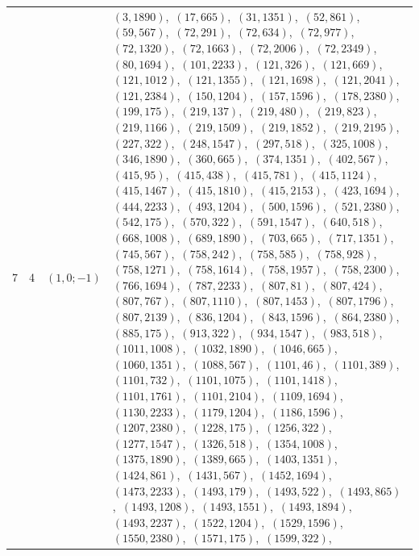 \documentclass[11pt]{article}
\begin{document}
\begin{longtable}{@{}rrl>{\raggedright\arraybackslash}p{}@{}}
7 & 4 & $(1,0;-1)$ & $(3,1890)$,\allowbreak\ $(17,665)$,\allowbreak\ $(31,1351)$,\allowbreak\ $(52,861)$,\allowbreak\ $(59,567)$,\allowbreak\ $(72,291)$,\allowbreak\ $(72,634)$,\allowbreak\ $(72,977)$,\allowbreak\ $(72,1320)$,\allowbreak\ $(72,1663)$,\allowbreak\ $(72,2006)$,\allowbreak\ $(72,2349)$,\allowbreak\ $(80,1694)$,\allowbreak\ $(101,2233)$,\allowbreak\ $(121,326)$,\allowbreak\ $(121,669)$,\allowbreak\ $(121,1012)$,\allowbreak\ $(121,1355)$,\allowbreak\ $(121,1698)$,\allowbreak\ $(121,2041)$,\allowbreak\ $(121,2384)$,\allowbreak\ $(150,1204)$,\allowbreak\ $(157,1596)$,\allowbreak\ $(178,2380)$,\allowbreak\ $(199,175)$,\allowbreak\ $(219,137)$,\allowbreak\ $(219,480)$,\allowbreak\ $(219,823)$,\allowbreak\ $(219,1166)$,\allowbreak\ $(219,1509)$,\allowbreak\ $(219,1852)$,\allowbreak\ $(219,2195)$,\allowbreak\ $(227,322)$,\allowbreak\ $(248,1547)$,\allowbreak\ $(297,518)$,\allowbreak\ $(325,1008)$,\allowbreak\ $(346,1890)$,\allowbreak\ $(360,665)$,\allowbreak\ $(374,1351)$,\allowbreak\ $(402,567)$,\allowbreak\ $(415,95)$,\allowbreak\ $(415,438)$,\allowbreak\ $(415,781)$,\allowbreak\ $(415,1124)$,\allowbreak\ $(415,1467)$,\allowbreak\ $(415,1810)$,\allowbreak\ $(415,2153)$,\allowbreak\ $(423,1694)$,\allowbreak\ $(444,2233)$,\allowbreak\ $(493,1204)$,\allowbreak\ $(500,1596)$,\allowbreak\ $(521,2380)$,\allowbreak\ $(542,175)$,\allowbreak\ $(570,322)$,\allowbreak\ $(591,1547)$,\allowbreak\ $(640,518)$,\allowbreak\ $(668,1008)$,\allowbreak\ $(689,1890)$,\allowbreak\ $(703,665)$,\allowbreak\ $(717,1351)$,\allowbreak\ $(745,567)$,\allowbreak\ $(758,242)$,\allowbreak\ $(758,585)$,\allowbreak\ $(758,928)$,\allowbreak\ $(758,1271)$,\allowbreak\ $(758,1614)$,\allowbreak\ $(758,1957)$,\allowbreak\ $(758,2300)$,\allowbreak\ $(766,1694)$,\allowbreak\ $(787,2233)$,\allowbreak\ $(807,81)$,\allowbreak\ $(807,424)$,\allowbreak\ $(807,767)$,\allowbreak\ $(807,1110)$,\allowbreak\ $(807,1453)$,\allowbreak\ $(807,1796)$,\allowbreak\ $(807,2139)$,\allowbreak\ $(836,1204)$,\allowbreak\ $(843,1596)$,\allowbreak\ $(864,2380)$,\allowbreak\ $(885,175)$,\allowbreak\ $(913,322)$,\allowbreak\ $(934,1547)$,\allowbreak\ $(983,518)$,\allowbreak\ $(1011,1008)$,\allowbreak\ $(1032,1890)$,\allowbreak\ $(1046,665)$,\allowbreak\ $(1060,1351)$,\allowbreak\ $(1088,567)$,\allowbreak\ $(1101,46)$,\allowbreak\ $(1101,389)$,\allowbreak\ $(1101,732)$,\allowbreak\ $(1101,1075)$,\allowbreak\ $(1101,1418)$,\allowbreak\ $(1101,1761)$,\allowbreak\ $(1101,2104)$,\allowbreak\ $(1109,1694)$,\allowbreak\ $(1130,2233)$,\allowbreak\ $(1179,1204)$,\allowbreak\ $(1186,1596)$,\allowbreak\ $(1207,2380)$,\allowbreak\ $(1228,175)$,\allowbreak\ $(1256,322)$,\allowbreak\ $(1277,1547)$,\allowbreak\ $(1326,518)$,\allowbreak\ $(1354,1008)$,\allowbreak\ $(1375,1890)$,\allowbreak\ $(1389,665)$,\allowbreak\ $(1403,1351)$,\allowbreak\ $(1424,861)$,\allowbreak\ $(1431,567)$,\allowbreak\ $(1452,1694)$,\allowbreak\ $(1473,2233)$,\allowbreak\ $(1493,179)$,\allowbreak\ $(1493,522)$,\allowbreak\ $(1493,865)$,\allowbreak\ $(1493,1208)$,\allowbreak\ $(1493,1551)$,\allowbreak\ $(1493,1894)$,\allowbreak\ $(1493,2237)$,\allowbreak\ $(1522,1204)$,\allowbreak\ $(1529,1596)$,\allowbreak\ $(1550,2380)$,\allowbreak\ $(1571,175)$,\allowbreak\ $(1599,322)$,\allowbreak\ 
\end{longtable}
\end{document}
